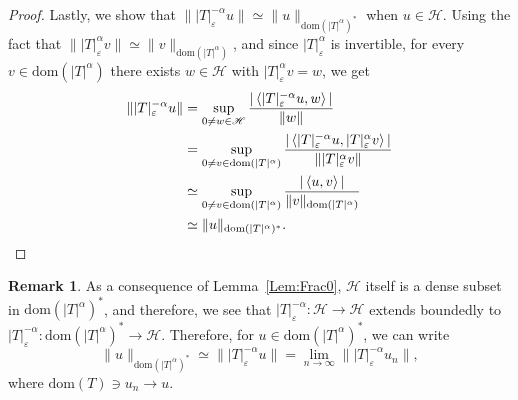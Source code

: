 \documentclass[a4paper,10pt,reqno]{amsart}
\newcommand{\modulus}[1]{|#1|}
\newcommand{\norm}[1]{\| #1 \|}%
\newcommand{\Hil}{\mathscr{H}}
\newcommand{\dom}{\mathrm{dom}}
\newcommand{\inprod}[1]{\left\langle #1 \right\rangle}%
\renewcommand{\epsilon}{\varepsilon}
\theoremstyle{definition}
\newtheorem{remark}[theorem]{Remark}
\begin{document}
\begin{proof}
Lastly, we show that $\norm{\modulus{T}^{-\alpha}_\epsilon u} \simeq \norm{u}_{\dom(\modulus{T}^\alpha)^\ast}$ when $u \in \Hil$.
Using the fact that $\norm{\modulus{T}^\alpha_\epsilon v} \simeq \norm{v}_{\dom(\modulus{T}^\alpha)}$, and since $\modulus{T}^\alpha_\epsilon$ is invertible, for every $v \in \dom(\modulus{T}^\alpha)$ there exists $w \in \Hil$ with $\modulus{T}^\alpha_\epsilon v = w$, we get
\begin{align*}
\norm{\modulus{T}^{-\alpha}_\epsilon u}
 & = \sup_{0 \neq w \in \Hil} \frac{\modulus{\inprod{\modulus{T}^{-\alpha}_\epsilon u,w}}}{\norm{w}}                                                                              \\
 & = \sup_{0 \neq v \in \dom(\modulus{T}^\alpha)}  \frac{\modulus{\inprod{\modulus{T}^{-\alpha}_\epsilon u,\modulus{T}^\alpha_\epsilon v}}}{\norm{\modulus{T}^\alpha_\epsilon v}} \\
 & \simeq \sup_{0 \neq v \in \dom(\modulus{T}^\alpha)}  \frac{\modulus{\inprod{u,v}}}{\norm{v}_{\dom(\modulus{T}^\alpha)}}                                                        \\
 & \simeq \norm{u}_{\dom(\modulus{T}^\alpha)^\ast}.
\qedhere
\end{align*}
\end{proof}


\begin{remark}
\label{Rem:FracPowerBd}
As a consequence of Lemma~\ref{Lem:Frac0}, $\Hil$ itself is a dense subset in $\dom(\modulus{T}^\alpha)^\ast$, and therefore, we see that $\modulus{T}_\epsilon^{-\alpha}:\Hil \to \Hil$ extends boundedly to $\modulus{T}_\epsilon^{-\alpha}: \dom(\modulus{T}^\alpha)^\ast \to \Hil$.
Therefore, for $u \in \dom(\modulus{T}^\alpha)^\ast$, we can write
$$\norm{u}_{\dom(\modulus{T}^\alpha)^\ast} \simeq \norm{\modulus{T}^{-\alpha}_\epsilon u} = \lim_{n \to \infty} \norm{\modulus{T}^{-\alpha}_\epsilon u_n},$$
where $\dom(T) \ni u_n \to u$.
\end{remark}
\end{document}
